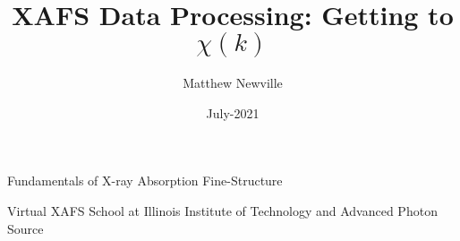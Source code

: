 \documentclass[9pt,aspectratio=1610]{beamer}
\begin{document}
\title[Virtual XAFS School]{XAFS Data Processing: Getting to $\chi(k)$}
\author[M Newville]{Matthew Newville}
\date{July-2021}


\begin{frame} \titlepage
  \vmm
  \begin{center}
    Fundamentals of X-ray Absorption Fine-Structure
  \end{center}

  \vmm

  \begin{cenpage}{60mm}
    Virtual XAFS School at Illinois Institute of Technology and Advanced
  Photon Source
\end{cenpage}
\end{frame}









\end{document}
